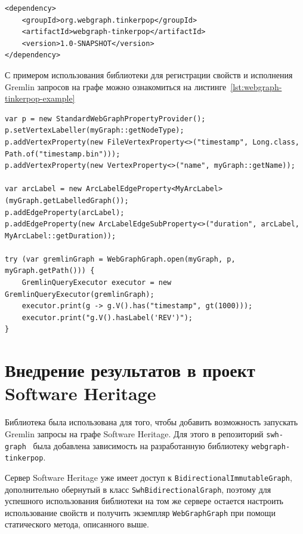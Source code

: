 \documentclass[times,specification,annotation]{itmo-student-thesis}
\begin{document}
\begin{lstlisting}[float=!h,caption={Добавление \texttt{webgraph-tinkerpop} в зависимости проекта},label={lst:maven-dep}]
<dependency>
    <groupId>org.webgraph.tinkerpop</groupId>
    <artifactId>webgraph-tinkerpop</artifactId>
    <version>1.0-SNAPSHOT</version>
</dependency>
\end{lstlisting}

С примером использования библиотеки для регистрации свойств и исполнения Gremlin запросов на графе можно ознакомиться на листинге~\ref{lst:webgraph-tinkerpop-example}

\begin{lstlisting}[float=!h,caption={Пример использования библиотеки для регистрации свойств и исполнения Gremlin запросов},label={lst:webgraph-tinkerpop-example}]
var p = new StandardWebGraphPropertyProvider();
p.setVertexLabeller(myGraph::getNodeType);
p.addVertexProperty(new FileVertexProperty<>("timestamp", Long.class, Path.of("timestamp.bin")));
p.addVertexProperty(new VertexProperty<>("name", myGraph::getName));

var arcLabel = new ArcLabelEdgeProperty<MyArcLabel>(myGraph.getLabelledGraph());
p.addEdgeProperty(arcLabel);
p.addEdgeProperty(new ArcLabelEdgeSubProperty<>("duration", arcLabel, MyArcLabel::getDuration));

try (var gremlinGraph = WebGraphGraph.open(myGraph, p, myGraph.getPath())) {
    GremlinQueryExecutor executor = new GremlinQueryExecutor(gremlinGraph);
    executor.print(g -> g.V().has("timestamp", gt(1000)));
    executor.print("g.V().hasLabel('REV')");
}
\end{lstlisting}

\section{Внедрение результатов в проект Software Heritage}

Библиотека была использована для того, чтобы добавить возможность запускать Gremlin запросы на графе Software Heritage. Для этого в репозиторий \texttt{swh-graph}~\cite{swh-graph} была добавлена зависимость на разработанную библиотеку \texttt{webgraph-tinkerpop}.

Сервер Software Heritage уже имеет доступ к \texttt{BidirectionalImmutableGraph}, дополнительно обернутый в класс \texttt{SwhBidirectionalGraph}, поэтому для успешного использования библиотеки на том же сервере остается настроить использование свойств и получить экземпляр \texttt{WebGraphGraph} при помощи статического метода, описанного выше.
\end{document}
